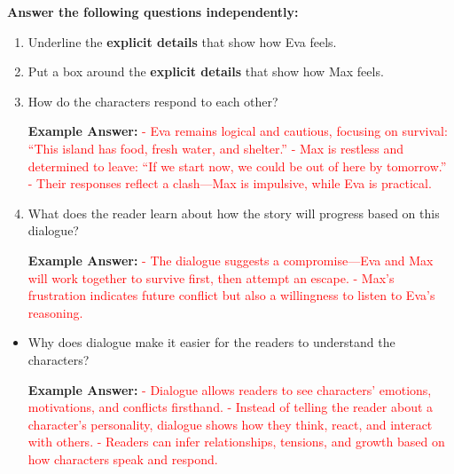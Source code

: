 \documentclass[12pt]{article}
\begin{document}
\begin{tcolorbox}[colframe=black!60, colback=white, 
coltitle=black, colbacktitle=black!15, fonttitle=\bfseries\Large, 
title=Independent Practice, halign title=center]
\textbf{Answer the following questions independently:}
\begin{enumerate}
    \item Underline the \textbf{explicit details} that show how Eva feels.
    \item Put a box around the \textbf{explicit details} that show how Max feels.
    \item How do the characters respond to each other?  
    \vspace{2em}

    \textbf{Example Answer:}  
    \textcolor{red}{
    - Eva remains logical and cautious, focusing on survival: “This island has food, fresh water, and shelter.”  
    - Max is restless and determined to leave: “If we start now, we could be out of here by tomorrow.”  
    - Their responses reflect a clash—Max is impulsive, while Eva is practical.}
    \vspace{2em}

    \item What does the reader learn about how the story will progress based on this dialogue?  
    \vspace{2em}

    \textbf{Example Answer:}  
    \textcolor{red}{
    - The dialogue suggests a compromise—Eva and Max will work together to survive first, then attempt an escape.  
    - Max’s frustration indicates future conflict but also a willingness to listen to Eva’s reasoning.}
\end{enumerate}
\end{tcolorbox}

\vspace{1em}

\begin{tcolorbox}[colframe=black!60, colback=white, 
coltitle=black, colbacktitle=black!15, fonttitle=\bfseries\Large, 
title=Exit Ticket, halign title=center]
\begin{itemize}
    \item Why does dialogue make it easier for the readers to understand the characters?
    \vspace{2em}

    \textbf{Example Answer:}  
    \textcolor{red}{
    - Dialogue allows readers to see characters’ emotions, motivations, and conflicts firsthand.  
    - Instead of telling the reader about a character’s personality, dialogue shows how they think, react, and interact with others.  
    - Readers can infer relationships, tensions, and growth based on how characters speak and respond.}
\end{itemize}
\end{tcolorbox}
\end{document}
